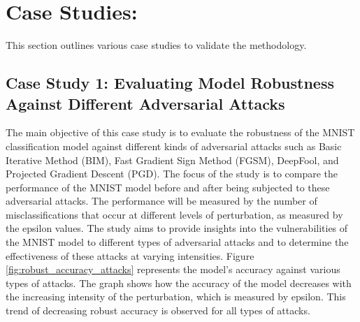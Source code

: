 \documentclass[10pt, conference, a4paper, final]{IEEEtran}
\begin{document}


\section{Case Studies:}

This section outlines various case studies to validate the methodology.

\subsection{Case Study 1: Evaluating Model Robustness Against Different Adversarial Attacks}

The main objective of this case study is to evaluate the robustness of the MNIST classification model 
against different kinds of adversarial attacks such as Basic Iterative Method (BIM), Fast Gradient Sign Method (FGSM), 
DeepFool, and Projected Gradient Descent (PGD). The focus of the study is to compare the performance of the MNIST model
before and after being subjected to these adversarial attacks. The performance will be measured by the number of misclassifications
that occur at different levels of perturbation, as measured by the epsilon values. The study aims to provide insights into the
vulnerabilities of the MNIST model to different types of adversarial attacks and to determine the effectiveness of these attacks 
at varying intensities. Figure \ref {fig:robust_accuracy_attacks} represents the model's accuracy against various types of attacks. 
The graph shows how the accuracy of the model decreases with the increasing intensity of the perturbation, which is measured by epsilon.
This trend of decreasing robust accuracy is observed for all types of attacks.
\end{document}
